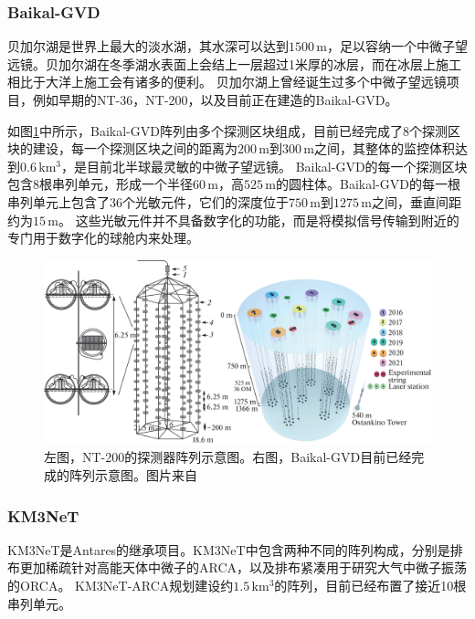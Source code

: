 \subsubsection*{Baikal-GVD}

贝加尔湖是世界上最大的淡水湖，其水深可以达到$1500\,\mathrm{m}$，足以容纳一个中微子望远镜。贝加尔湖在冬季湖水表面上会结上一层超过1米厚的冰层，而在冰层上施工相比于大洋上施工会有诸多的便利。
贝加尔湖上曾经诞生过多个中微子望远镜项目，例如早期的NT-36，NT-200\cite{NT_200:1997}，以及目前正在建造的Baikal-GVD\cite{BAIKAL_design:1997}。

如图\ref{fig:Baikal_scope}中所示，Baikal-GVD阵列由多个探测区块组成，目前已经完成了8个探测区块的建设，每一个探测区块之间的距离为$200\,\mathrm{m}$到$300\,\mathrm{m}$之间，其整体的监控体积达到$0.6\,\mathrm{km^3}$，是目前北半球最灵敏的中微子望远镜。
Baikal-GVD的每一个探测区块包含8根串列单元，形成一个半径$60\,\mathrm{m}$，高$525\,\mathrm{m}$的圆柱体。Baikal-GVD的每一根串列单元上包含了36个光敏元件，它们的深度位于$750\,\mathrm{m}$到$1275\,\mathrm{m}$之间，垂直间距约为$15\, \mathrm{m}$。
这些光敏元件并不具备数字化的功能，而是将模拟信号传输到附近的专门用于数字化的球舱内来处理。

\begin{figure}[!htb]
    \centering
    \includegraphics[width=0.9\linewidth]{img/Baikal_scope.jpg}
    \caption{左图，NT-200的探测器阵列示意图。右图，Baikal-GVD目前已经完成的阵列示意图。图片来自\parencite{Baikal_status:2022}}
    \label{fig:Baikal_scope}
\end{figure}

\subsubsection*{KM3NeT}

KM3NeT是Antares的继承项目\cite{KM3Net_letter_of_intent:2016}。KM3NeT中包含两种不同的阵列构成，分别是排布更加稀疏针对高能天体中微子的ARCA，以及排布紧凑用于研究大气中微子振荡的ORCA。
KM3NeT-ARCA规划建设约$1.5\,\mathrm{km^3}$的阵列，目前已经布置了接近10根串列单元。

